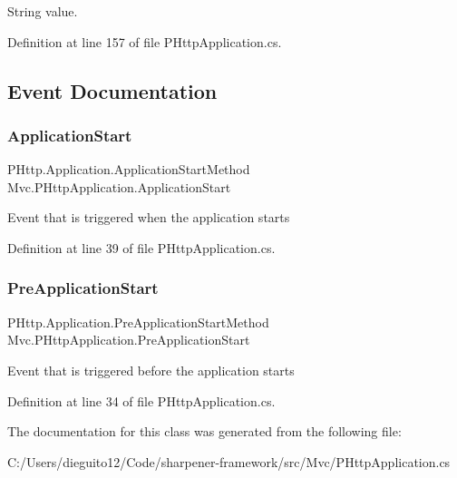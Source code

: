 String value.

Definition at line 157 of file P\+Http\+Application.\+cs.



\subsection{Event Documentation}
\mbox{\label{class_mvc_1_1_p_http_application_a925464a1e616113cb0975ca67c49a591}} 
\subsubsection{\texorpdfstring{Application\+Start}{ApplicationStart}}
{\footnotesize\ttfamily P\+Http.\+Application.\+Application\+Start\+Method Mvc.\+P\+Http\+Application.\+Application\+Start}



Event that is triggered when the application starts 



Definition at line 39 of file P\+Http\+Application.\+cs.

\mbox{\label{class_mvc_1_1_p_http_application_acb22952466023ec2a4a6442866f8fbe9}} 
\subsubsection{\texorpdfstring{Pre\+Application\+Start}{PreApplicationStart}}
{\footnotesize\ttfamily P\+Http.\+Application.\+Pre\+Application\+Start\+Method Mvc.\+P\+Http\+Application.\+Pre\+Application\+Start}



Event that is triggered before the application starts 



Definition at line 34 of file P\+Http\+Application.\+cs.



The documentation for this class was generated from the following file\+:\begin{DoxyCompactItemize}
\item 
C\+:/\+Users/dieguito12/\+Code/sharpener-\/framework/src/\+Mvc/P\+Http\+Application.\+cs\end{DoxyCompactItemize}
